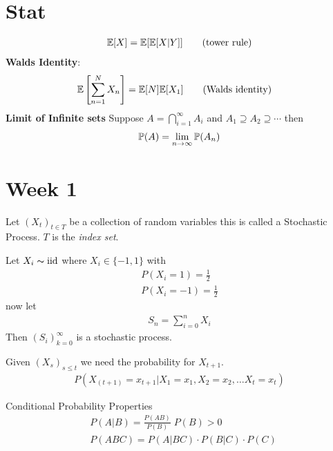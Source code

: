 \documentclass[12pt,a4paper]{article}
\begin{document}
\section*{Stat}
\begin{align*}
\mathbb{E}[X] = \mathbb{E}[\mathbb{E}[X|Y]] \tag{tower rule}
\end{align*}
\textbf{Walds Identity}:\\
\begin{align*}
&\mathbb{E}\left[\sum\limits_{n=1}^{N}X_n\right] = \mathbb{E}[N]\mathbb{E}[X_1] \tag{Walds identity}
\end{align*}
\textbf{Limit of Infinite sets}
Suppose $A = \bigcap_{i=1}^\infty A_i$ and $A_1 \supseteq A_2 \supseteq \cdots $ then 
\begin{align*}
\mathbb{P}(A) = \lim\limits_{n \rightarrow \infty} \mathbb{P}(A_n)
\end{align*}

\newpage
\section{Week 1}
\begin{defn}
Let $(X_t)_{t\in T}$ be a collection of random variables this is called a Stochastic Process. $T$ is the \textit{index set}. 
\end{defn}
\begin{example}
Let $X_i\thicksim \mathrm{iid}$ where $X_i \in \{-1,1\}$ with 
\begin{align*}
P(X_i = 1) = \frac{1}{2}\\
P(X_i = -1) = \frac{1}{2}
\end{align*}
now let 
\begin{align*}
S_n = \sum_{i=0}^n X_i
\end{align*}
Then $(S_i)_{k=0}^\infty$ is a stochastic process.  
\end{example}

\begin{defn}
Given $(X_s)_{s \leq t}$ we need the probability for $X_{t+1}$.
\begin{align*}
P(X_{(t+1)} = x_{t+1} \vert X_1 = x_1 , X_2 = x_2, \ldots X_t = x_t)
\end{align*}
\end{defn}


\begin{note}{Conditional Probability Properties}
\begin{align*}
&P(A | B) = \frac{P(AB)}{P(B)} \; P(B) > 0\\
&P(ABC) = P(A|BC) \cdot P(B|C) \cdot P(C)
\end{align*}
\end{note}
\end{document}
